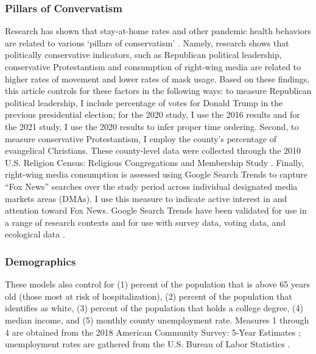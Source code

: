 \hypertarget{pillars-of-convervatism}{%
\subsubsection{Pillars of Convervatism}\label{pillars-of-convervatism}}

Research has shown that stay-at-home rates and other pandemic health behaviors
are related to various `pillars of conservatism' \citep{gonzalez_etal21,hillBloodChristCompels2020,hillLoveThyAged2021, hillNastiestQuestion}. Namely, research shows that politically conservative
indicators, such as Republican political leadership, conservative Protestantism
and consumption of right-wing media are related to higher rates of movement and
lower rates of mask usage. Based on these findings, this article controls for
these factors in the following ways: to measure Republican political leadership,
I include percentage of votes for Donald Trump in the previous presidential
election; for the 2020 study, I use the 2016 results and for the 2021 study, I
use the 2020 results to infer proper time ordering. Second, to measure
conservative Protestantism, I employ the county's percentage of evangelical
Christians. These county-level data were collected through the 2010 U.S.
Religion Census: Religious Congregations and Membership Study \citep{grammich_etal18}. Finally, right-wing media consumption is assessed using
Google Search Trends to capture ``Fox News'' searches over the study period across
individual designated media markets areas (DMAs). I use this measure to indicate
active interest in and attention toward Fox News. Google Search Trends have been
validated for use in a range of research contexts and for use with survey data,
voting data, and ecological data \citep{bailPrestigeProximityPrejudice2019, reyesUsingInternetSearch2018, scheitleGoogleInsightsSearch2011, stephensdavidowitzCostRacialAnimus2014, swearingenGoogleInsightsSenate2014}.

\hypertarget{demographics}{%
\subsubsection{Demographics}\label{demographics}}

These models also control for (1) percent of the population that is above 65
years old (those most at risk of hospitalization), (2) percent of the population
that identifies as white, (3) percent of the population that holds a college
degree, (4) median income, and (5) monthly county unemployment rate. Measures 1
through 4 are obtained from the 2018 American Community Survey: 5-Year Estimates \citep{uscensusbureauAmericanCommunitySurvey2018}; unemployment rates are gathered
from the U.S. Bureau of Labor Statistics \citep{labor2020a}.

